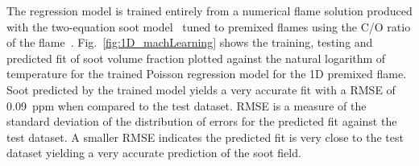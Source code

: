 \documentclass[12pt]{CHT-20}
\begin{document}
The regression model is trained entirely from a numerical flame solution produced with the two-equation soot model~\citep[]{Leung_Lindstedt_Jones} tuned to premixed flames using the C/O ratio of the flame~\citep[]{Roy}.
Fig.~\ref{fig:1D_machLearning} shows the training, testing and predicted fit of soot volume fraction plotted against the natural logarithm of temperature for the trained Poisson regression model for the 1D premixed flame. Soot predicted by the trained model yields a very accurate fit with a RMSE of 0.09~ppm when compared to the test dataset. 
RMSE is a measure of the standard deviation of the distribution of errors for the predicted fit against the test dataset. A smaller RMSE indicates the predicted fit is very close to the test dataset yielding a very accurate prediction of the soot field.
\end{document}
